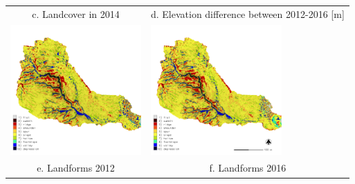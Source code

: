 \documentclass{standalone}
\begin{document}
\begin{tabular}{m{} m{}}
\multicolumn{1}{c}{c. Landcover in 2014} & \multicolumn{1}{c}{d. Elevation difference between 2012-2016 [m]}\\
%
\includegraphics[height=50mm,center]{../../images/sample_data/landforms_2012.png} &
\includegraphics[height=50mm,center]{../../images/sample_data/landforms_2016_carto.png}\\
\multicolumn{1}{c}{e. Landforms 2012} & \multicolumn{1}{c}{f. Landforms 2016}\\
%
\end{tabular}
\end{document}
